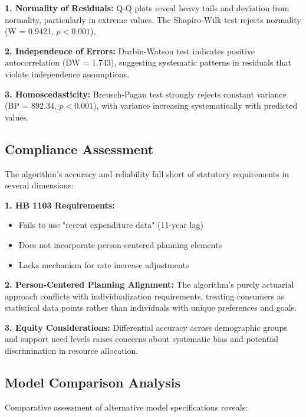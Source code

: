 \textbf{1. Normality of Residuals:}
Q-Q plots reveal heavy tails and deviation from normality, particularly in extreme values. The Shapiro-Wilk test rejects normality (W = 0.9421, $p < 0.001$).

\textbf{2. Independence of Errors:}
Durbin-Watson test indicates positive autocorrelation (DW = 1.743), suggesting systematic patterns in residuals that violate independence assumptions.

\textbf{3. Homoscedasticity:}
Breusch-Pagan test strongly rejects constant variance (BP = 892.34, $p < 0.001$), with variance increasing systematically with predicted values.

\subsection{Compliance Assessment}

The algorithm's accuracy and reliability fall short of statutory requirements in several dimensions:

\textbf{1. HB 1103 Requirements:}
\begin{itemize}
    \item Fails to use "recent expenditure data" (11-year lag)
    \item Does not incorporate person-centered planning elements
    \item Lacks mechanism for rate increase adjustments
\end{itemize}

\textbf{2. Person-Centered Planning Alignment:}
The algorithm's purely actuarial approach conflicts with individualization requirements, treating consumers as statistical data points rather than individuals with unique preferences and goals.

\textbf{3. Equity Considerations:}
Differential accuracy across demographic groups and support need levels raises concerns about systematic bias and potential discrimination in resource allocation.

\subsection{Model Comparison Analysis}

Comparative assessment of alternative model specifications reveals:

